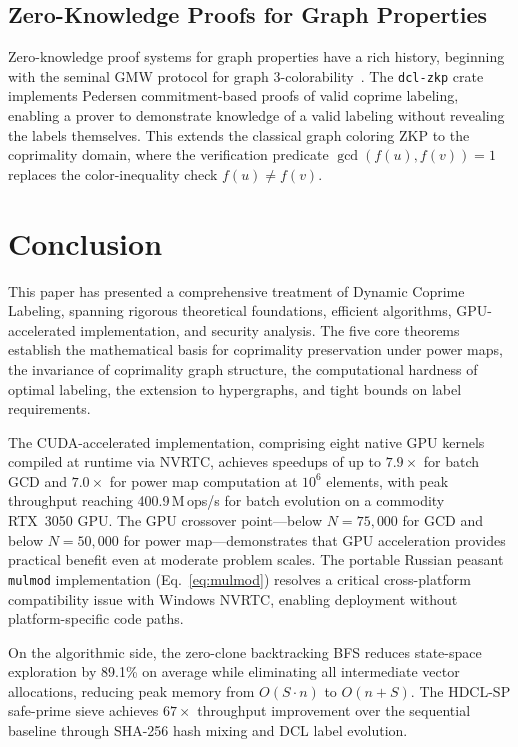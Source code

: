 \documentclass[lettersize,journal]{IEEEtran}
\begin{document}
\subsection{Zero-Knowledge Proofs for Graph Properties}

Zero-knowledge proof systems for graph properties have a rich history, beginning with the seminal GMW protocol for graph 3-colorability~\cite{bach1996}. The \texttt{dcl-zkp} crate implements Pedersen commitment-based proofs of valid coprime labeling, enabling a prover to demonstrate knowledge of a valid labeling without revealing the labels themselves. This extends the classical graph coloring ZKP to the coprimality domain, where the verification predicate $\gcd(f(u), f(v)) = 1$ replaces the color-inequality check $f(u) \neq f(v)$.

\section{Conclusion}
\label{sec:conclusion}

This paper has presented a comprehensive treatment of Dynamic Coprime Labeling, spanning rigorous theoretical foundations, efficient algorithms, GPU-accelerated implementation, and security analysis. The five core theorems establish the mathematical basis for coprimality preservation under power maps, the invariance of coprimality graph structure, the computational hardness of optimal labeling, the extension to hypergraphs, and tight bounds on label requirements.

The CUDA-accelerated implementation, comprising eight native GPU kernels compiled at runtime via NVRTC, achieves speedups of up to $7.9\times$ for batch GCD and $7.0\times$ for power map computation at $10^6$ elements, with peak throughput reaching 400.9\,M\,ops/s for batch evolution on a commodity RTX~3050 GPU. The GPU crossover point---below $N = 75{,}000$ for GCD and below $N = 50{,}000$ for power map---demonstrates that GPU acceleration provides practical benefit even at moderate problem scales. The portable Russian peasant \texttt{mulmod} implementation (Eq.~\ref{eq:mulmod}) resolves a critical cross-platform compatibility issue with Windows NVRTC, enabling deployment without platform-specific code paths.

On the algorithmic side, the zero-clone backtracking BFS reduces state-space exploration by 89.1\% on average while eliminating all intermediate vector allocations, reducing peak memory from $O(S \cdot n)$ to $O(n + S)$. The HDCL-SP safe-prime sieve achieves $67\times$ throughput improvement over the sequential baseline through SHA-256 hash mixing and DCL label evolution.
\end{document}
